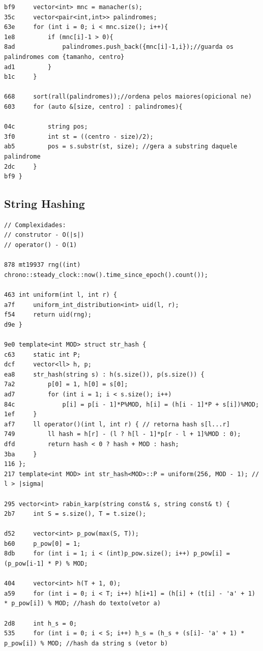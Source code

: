 \documentclass[11pt, a4paper, twoside]{article}
\begin{document}
{\begin{lstlisting}
bf9     vector<int> mnc = manacher(s);
35c     vector<pair<int,int>> palindromes;
63e     for (int i = 0; i < mnc.size(); i++){
1e8         if (mnc[i]-1 > 0){
8ad             palindromes.push_back({mnc[i]-1,i});//guarda os palindromes com {tamanho, centro}
ad1         }
b1c     }
    
668     sort(rall(palindromes));//ordena pelos maiores(opicional ne)
603     for (auto &[size, centro] : palindromes){
    
04c         string pos;
3f0         int st = ((centro - size)/2);
ab5         pos = s.substr(st, size); //gera a substring daquele palindrome
2dc     }
bf9 }
\end{lstlisting}

\subsection{String Hashing}
\begin{lstlisting}
// Complexidades:
// construtor - O(|s|)
// operator() - O(1)

878 mt19937 rng((int) chrono::steady_clock::now().time_since_epoch().count());
 
463 int uniform(int l, int r) {
a7f 	uniform_int_distribution<int> uid(l, r);
f54 	return uid(rng);
d9e }
 
9e0 template<int MOD> struct str_hash {
c63 	static int P;
dcf 	vector<ll> h, p;
ea8 	str_hash(string s) : h(s.size()), p(s.size()) {
7a2 		p[0] = 1, h[0] = s[0];
ad7 		for (int i = 1; i < s.size(); i++)
84c 			p[i] = p[i - 1]*P%MOD, h[i] = (h[i - 1]*P + s[i])%MOD;
1ef 	}
af7 	ll operator()(int l, int r) { // retorna hash s[l...r]
749 		ll hash = h[r] - (l ? h[l - 1]*p[r - l + 1]%MOD : 0);
dfd 		return hash < 0 ? hash + MOD : hash;
3ba 	}
116 };
217 template<int MOD> int str_hash<MOD>::P = uniform(256, MOD - 1); // l > |sigma|

295 vector<int> rabin_karp(string const& s, string const& t) {
2b7     int S = s.size(), T = t.size();
            
d52     vector<int> p_pow(max(S, T)); 
b60     p_pow[0] = 1; 
8db     for (int i = 1; i < (int)p_pow.size(); i++) p_pow[i] = (p_pow[i-1] * P) % MOD;
        
404     vector<int> h(T + 1, 0); 
a59     for (int i = 0; i < T; i++) h[i+1] = (h[i] + (t[i] - 'a' + 1) * p_pow[i]) % MOD; //hash do texto(vetor a)
        
2d8     int h_s = 0; 
535     for (int i = 0; i < S; i++) h_s = (h_s + (s[i]- 'a' + 1) * p_pow[i]) % MOD; //hash da string s (vetor b)
        

\end{lstlisting}}
\end{document}
